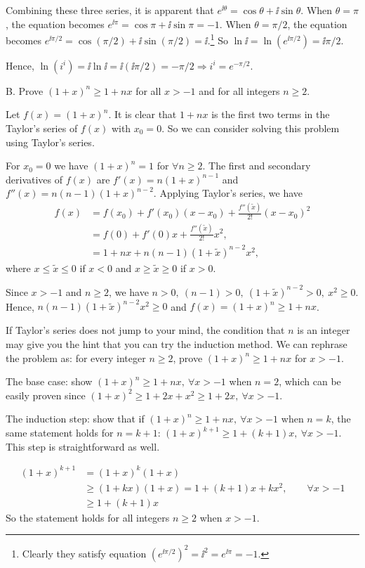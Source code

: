 
Combining these three series, it is apparent that
\(e^{\ii\theta}=\cos\theta+\ii\sin\theta.\)
When \(\theta=\pi\), the equation becomes
\(e^{\ii\pi}=\cos\pi+\ii\sin\pi=-1.\)
When \(\theta=\pi/2\), the equation becomes
\(e^{\ii\pi/2}=\cos(\pi/2)+\ii\sin(\pi/2)=\ii.\)\footnote[3]{Clearly they satisfy equation \((e^{\ii\pi/2})^2=\ii^2=e^{\ii\pi}=-1\).}
So \(\ln \ii=\ln(e^{\ii\pi/2})=\ii\pi/2.\)

Hence, \(\ln(i^i)=\ii\ln \ii=\ii(\ii\pi/2)=-\pi/2\Rightarrow i^i=e^{-\pi/2}.\)

\begin{problem}{B. Prove \((1+x)^n\ge 1+nx\) for all \(x>-1\) and for all integers \(n\ge 2\).}
\end{problem}

\begin{solution}
Let \(f(x)=(1+x)^n\). It is clear that \(1+nx\) is the first two terms in the Taylor's series of \(f(x)\) with \(x_0=0\). So we can consider solving this problem using Taylor's series.

For \(x_0=0\) we have \((1+x)^n=1\) for \(\forall n\ge 2\). The first and secondary derivatives of \(f(x)\) are \(f'(x)=n(1+x)^{n-1}\) and \(f''(x)=n(n-1)(1+x)^{n-2}\). Applying Taylor's series, we have
\[
\begin{aligned}
f(x)&=f(x_0)+f'(x_0)(x-x_0)+\frac{f''(\widetilde{x})}{2!}(x-x_0)^2\\
&=f(0)+f'(0)x+\frac{f''(\widetilde{x})}{2!}x^2,\\
&=1+nx+n(n-1)(1+\widetilde{x})^{n-2}x^2,
\end{aligned}
\]
where \(x\le\widetilde{x}\le 0\) if \(x<0\) and \(x\ge\widetilde{x}\ge 0\) if \(x>0\).

Since \(x>-1\) and \(n\ge 2\), we have \(n>0,\ (n-1)>0,\ (1+\widetilde{x})^{n-2}>0,\ x^2\ge 0\).
Hence, \(n(n-1)(1+\widetilde{x})^{n-2}x^2\ge 0\) and \(f(x)=(1+x)^n\ge 1+nx\).

If Taylor's series does not jump to your mind, the condition that \(n\) is an integer may give you the hint that you can try the induction method. We can rephrase the problem as: for every integer \(n\ge 2\), prove \((1+x)^n\ge 1+nx\) for \(x>-1\).

The base case: show \((1+x)^n\ge 1+nx,\ \forall x>-1\) when \(n=2\), which can be easily proven since \((1+x)^2\ge 1+2x+x^2\ge 1+2x,\ \forall x>-1\).

The induction step: show that if \((1+x)^n\ge 1+nx,\ \forall x>-1\) when \(n=k\), the same statement holds for \(n=k+1\): \((1+x)^{k+1}\ge 1+(k+1)x,\ \forall x>-1\). This step is straightforward as well.

\[
\begin{aligned}
(1+x)^{k+1}&=(1+x)^k(1+x)\\
&\ge (1+kx)(1+x)=1+(k+1)x+kx^2,\qquad \forall x>-1\\
&\ge 1+(k+1)x
\end{aligned}
\]
So the statement holds for all integers \(n\ge 2\) when \(x>-1\).
\end{solution}

